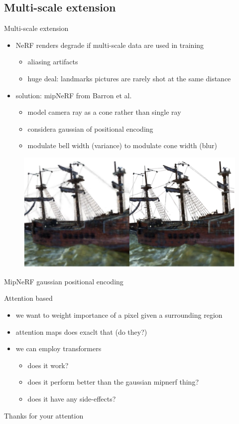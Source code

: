 \documentclass[aspectratio=1610]{beamer}
\begin{document}
\subsection{Multi-scale extension}
\begin{frame}{Multi-scale extension}
    \begin{itemize}
        \item NeRF renders degrade if multi-scale data are used in training 
        \begin{itemize}
            \item aliasing artifacts
            \item huge deal: landmarks pictures are rarely shot at the same distance
        \end{itemize}
        \item solution: mipNeRF from Barron et al.\cite{barron2021mipnerf}
        \begin{itemize}
            \item model camera ray as a cone rather than single ray
            \item considera gaussian of positional encoding
            \item modulate bell width (variance) to modulate cone width (blur)
        \end{itemize}
    \end{itemize}
    \bigskip
    \begin{figure}[H]
        \includegraphics[width=.4\textwidth]{mipnerf-results.png}
    \end{figure}
\end{frame}

\begin{frame}{MipNeRF gaussian positional encoding}
    \begin{center}
    \end{center}
\end{frame}

\begin{frame}{Attention based}
    \begin{itemize}
        \item we want to weight importance of a pixel given a surrounding region
        \item attention maps does exaclt that (do they?)
        \item we can employ transformers
        \begin{itemize}
            \item does it work?
            \item does it perform better than the gaussian mipnerf thing?
            \item does it have any side-effects?
        \end{itemize}
    \end{itemize}
\end{frame}

\begin{frame}
    \begin{center}
        Thanks for your attention
    \end{center}
\end{frame}
\end{document}
